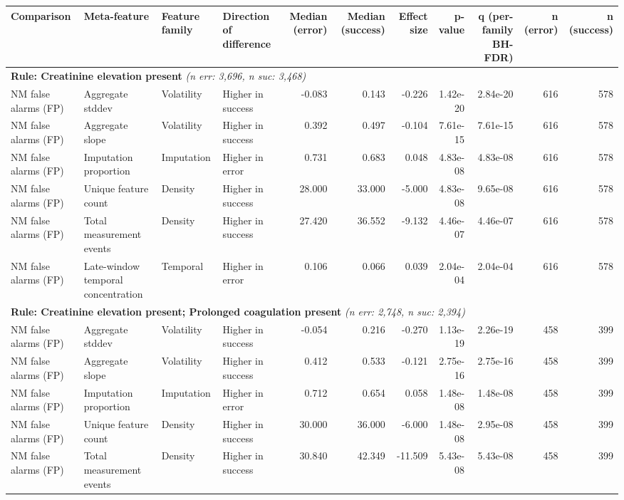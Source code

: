 \documentclass[border=0pt]{standalone}
\begin{document}
\begin{adjustbox}{width=\textwidth}
\begin{tabular}{@{}llllrrrrrrr@{}}
\toprule
Comparison & Meta-feature & Feature family & Direction of difference & Median (error) & Median (success) & Effect size & p-value & q (per-family BH-FDR) & n (error) & n (success) \\
\midrule
\multicolumn{11}{l}{\textbf{Rule: Creatinine elevation present} \textit{(n err: 3,696, n suc: 3,468)}} \\
NM false alarms (FP) & Aggregate stddev & Volatility & Higher in success & -0.083 & 0.143 & -0.226 & 1.42e-20 & 2.84e-20 & 616 & 578 \\
NM false alarms (FP) & Aggregate slope & Volatility & Higher in success & 0.392 & 0.497 & -0.104 & 7.61e-15 & 7.61e-15 & 616 & 578 \\
NM false alarms (FP) & Imputation proportion & Imputation & Higher in error & 0.731 & 0.683 & 0.048 & 4.83e-08 & 4.83e-08 & 616 & 578 \\
NM false alarms (FP) & Unique feature count & Density & Higher in success & 28.000 & 33.000 & -5.000 & 4.83e-08 & 9.65e-08 & 616 & 578 \\
NM false alarms (FP) & Total measurement events & Density & Higher in success & 27.420 & 36.552 & -9.132 & 4.46e-07 & 4.46e-07 & 616 & 578 \\
NM false alarms (FP) & Late-window temporal concentration & Temporal & Higher in error & 0.106 & 0.066 & 0.039 & 2.04e-04 & 2.04e-04 & 616 & 578 \\
\multicolumn{11}{l}{\textbf{Rule: Creatinine elevation present; Prolonged coagulation present} \textit{(n err: 2,748, n suc: 2,394)}} \\
NM false alarms (FP) & Aggregate stddev & Volatility & Higher in success & -0.054 & 0.216 & -0.270 & 1.13e-19 & 2.26e-19 & 458 & 399 \\
NM false alarms (FP) & Aggregate slope & Volatility & Higher in success & 0.412 & 0.533 & -0.121 & 2.75e-16 & 2.75e-16 & 458 & 399 \\
NM false alarms (FP) & Imputation proportion & Imputation & Higher in error & 0.712 & 0.654 & 0.058 & 1.48e-08 & 1.48e-08 & 458 & 399 \\
NM false alarms (FP) & Unique feature count & Density & Higher in success & 30.000 & 36.000 & -6.000 & 1.48e-08 & 2.95e-08 & 458 & 399 \\
NM false alarms (FP) & Total measurement events & Density & Higher in success & 30.840 & 42.349 & -11.509 & 5.43e-08 & 5.43e-08 & 458 & 399 \\

\end{tabular}
\end{adjustbox}
\end{document}
